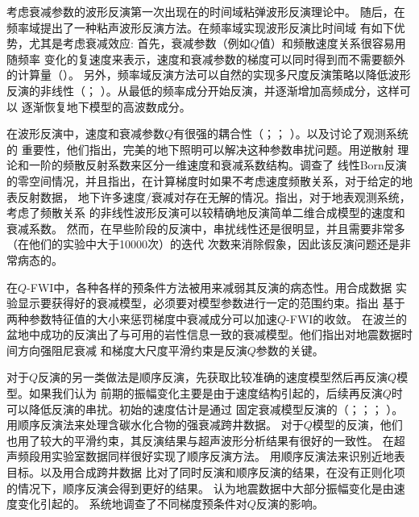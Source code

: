 考虑衰减参数的波形反演第一次出现在的时间域粘弹波形反演理论中。
随后，在频率域提出了一种粘声波形反演方法。在频率域实现波形反演比时间域
有如下优势，尤其是考虑衰减效应: 首先，衰减参数（例如$Q$值）和频散速度关系很容易用随频率
变化的复速度来表示，速度和衰减参数的梯度可以同时得到而不需要额外的计算量（）。
另外，频率域反演方法可以自然的实现多尺度反演策略以降低波形反演的非线性（；
）。从最低的频率成分开始反演，并逐渐增加高频成分，这样可以
逐渐恢复地下模型的高波数成分。

在波形反演中，速度和衰减参数$Q$有很强的耦合性（；；
）。以及讨论了观测系统的
重要性，他们指出，完美的地下照明可以解决这种参数串扰问题。用逆散射
理论和一阶的频散反射系数来区分一维速度和衰减系数结构。调查了
线性Born反演的零空间情况，并且指出，在计算梯度时如果不考虑速度频散关系，对于给定的地表反射数据，
地下许多速度/衰减对存在无解的情况。指出，对于地表观测系统，考虑了频散关系
的非线性波形反演可以较精确地反演简单二维合成模型的速度和衰减系数。
然而，在早些阶段的反演中，串扰线性还是很明显，并且需要非常多（在他们的实验中大于10000次）的迭代
次数来消除假象，因此该反演问题还是非常病态的。

在$Q$-FWI中，各种各样的预条件方法被用来减弱其反演的病态性。用合成数据
实验显示要获得好的衰减模型，必须要对模型参数进行一定的范围约束。指出
基于两种参数特征值的大小来惩罚梯度中衰减成分可以加速$Q$-FWI的收敛。
在波兰的盆地中成功的反演出了与可用的岩性信息一致的衰减模型。他们指出对地震数据时间方向强阻尼衰减
和梯度大尺度平滑约束是反演$Q$参数的关键。

对于$Q$反演的另一类做法是顺序反演，先获取比较准确的速度模型然后再反演$Q$模型。如果我们认为
前期的振幅变化主要是由于速度结构引起的，后续再反演$Q$时可以降低反演的串扰。初始的速度估计是通过
固定衰减模型反演的（；；；
）。用顺序反演法来处理含碳水化合物的强衰减跨井数据。
对于$Q$模型的反演，他们也用了较大的平滑约束，其反演结果与超声波形分析结果有很好的一致性。
在超声频段用实验室数据同样很好实现了顺序反演方法。
用顺序反演法来识别近地表目标。以及用合成跨井数据
比对了同时反演和顺序反演的结果，在没有正则化项的情况下，顺序反演会得到更好的结果。
认为地震数据中大部分振幅变化是由速度变化引起的。
系统地调查了不同梯度预条件对$Q$反演的影响。

